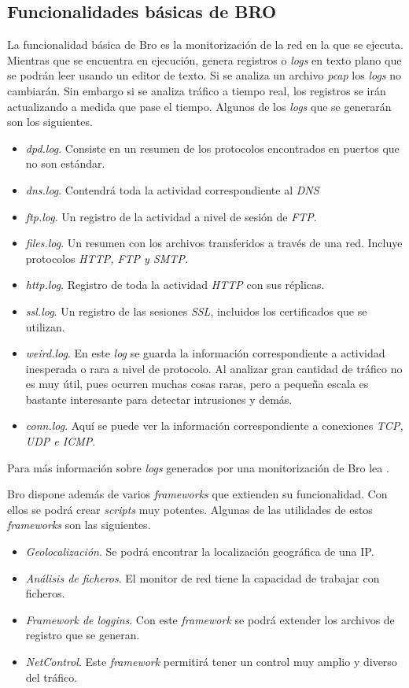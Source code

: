 \subsection{Funcionalidades básicas de BRO}

La funcionalidad básica de Bro es la monitorización de la red en la que se ejecuta. 
Mientras que se encuentra en ejecución, genera registros o \textit{logs} en texto plano que se 
podrán leer usando un editor de texto. Si se analiza un archivo \textit{pcap} los \textit{logs} no cambiarán. Sin 
embargo si se analiza tráfico a tiempo real, los registros se irán actualizando a medida que pase el tiempo. 
Algunos de los \textit{logs} que se generarán son los siguientes.

\begin{itemize}
\item \textit{dpd.log}. Consiste en un resumen de los protocolos encontrados en puertos que no son estándar.
\item \textit{dns.log}. Contendrá toda la actividad correspondiente al \textit{DNS}
\item \textit{ftp.log}. Un registro de la actividad a nivel de sesión de \textit{FTP}.
\item \textit{files.log}. Un resumen con los archivos transferidos a través de una red. Incluye 
protocolos \textit{HTTP, FTP y SMTP.}
\item \textit{http.log}. Registro de toda la actividad \textit{HTTP} con sus réplicas.
\item \textit{ssl.log}. Un registro de las sesiones \textit{SSL}, incluidos los certificados que se utilizan.
\item \textit{weird.log}. En este \textit{log} se guarda la información correspondiente a actividad 
inesperada o rara a nivel de protocolo. Al analizar gran cantidad de tráfico no es muy útil, pues ocurren 
muchas cosas raras, pero a pequeña escala es bastante interesante para detectar intrusiones y demás.
\item \textit{conn.log}. Aquí se puede ver la información correspondiente a conexiones  \textit{TCP, UDP e ICMP}.
\end{itemize}

\intro Para más información sobre \textit{logs} generados por una monitorización de Bro lea \cite{brologs}.

\intro Bro dispone además de varios \textit{frameworks} que extienden su funcionalidad. Con ellos se podrá crear \textit{scripts} muy potentes. Algunas de las utilidades de estos \textit{frameworks} son las siguientes.
\begin{itemize}
\item \textit{Geolocalización}. Se podrá encontrar la localización geográfica de una IP.
\item \textit{Análisis de ficheros}. El monitor de red tiene la capacidad de trabajar con ficheros.
\item \textit{Framework de loggins}. Con este \textit{framework} se podrá extender los archivos de registro que se generan.
\item \textit{NetControl}. Este \textit{framework} permitirá tener un control muy amplio y diverso del tráfico.
\end{itemize}

